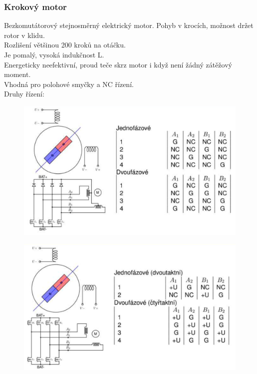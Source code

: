 \subsubsection{Krokový motor}
Bezkomutátorový stejnosměrný elektrický motor. Pohyb v krocích, možnost držet rotor v klidu.\\
Rozlišení většinou 200 kroků na otáčku.\\
Je pomalý, vysoká indukčnost L.\\
Energeticky neefektivní, proud teče skrz motor i když není žádný zátěžový moment.\\
Vhodná pro polohové smyčky a NC řízení.\\
Druhy řízení:
\begin{figure}[h!]
    \centering
    \includegraphics[scale = 0.3]{img/UniPol.png}
\end{figure}
\begin{figure}[h!]
    \centering
    \includegraphics[scale = 0.3]{img/BiPol.png}
\end{figure}

